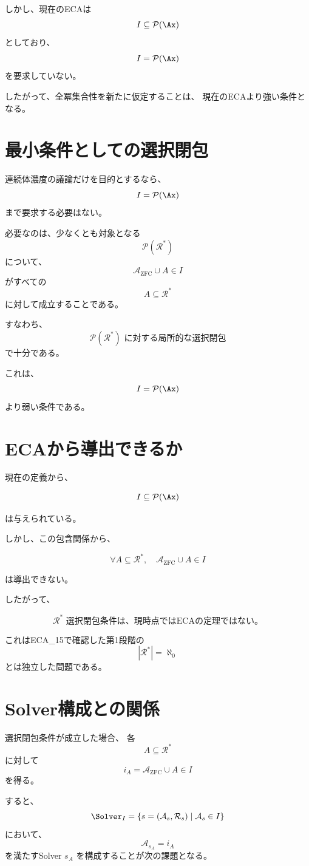 \documentclass[11pt,a4paper]{article}
\begin{document}
しかし、現在のECAは
\[
I\subseteq\mathcal P(\Ax)
\]
としており、
\[
I=\mathcal P(\Ax)
\]
を要求していない。

したがって、全冪集合性を新たに仮定することは、
現在のECAより強い条件となる。

\section{最小条件としての選択閉包}

連続体濃度の議論だけを目的とするなら、
\[
I=\mathcal P(\Ax)
\]
まで要求する必要はない。

必要なのは、少なくとも対象となる
\[
\mathcal P(\mathcal R^*)
\]
について、
\[
\mathcal A_{\mathrm{ZFC}}\cup A\in I
\]
がすべての
\[
A\subseteq\mathcal R^*
\]
に対して成立することである。

すなわち、
\[
\boxed{
\mathcal P(\mathcal R^*)
\text{ に対する局所的な選択閉包}
}
\]
で十分である。

これは、
\[
I=\mathcal P(\Ax)
\]
より弱い条件である。

\section{ECAから導出できるか}

現在の定義から、

\[
I\subseteq\mathcal P(\Ax)
\]

は与えられている。

しかし、この包含関係から、

\[
\forall A\subseteq\mathcal R^*,
\quad
\mathcal A_{\mathrm{ZFC}}\cup A\in I
\]

は導出できない。

したがって、

\[
\boxed{
\text{$\mathcal R^*$ 選択閉包条件は、現時点ではECAの定理ではない。}
}
\]

これはECA\_15で確認した第1段階の
\[
|\mathcal R^*|=\aleph_0
\]
とは独立した問題である。

\section{Solver構成との関係}

選択閉包条件が成立した場合、
各
\[
A\subseteq\mathcal R^*
\]
に対して
\[
i_A
=
\mathcal A_{\mathrm{ZFC}}\cup A
\in I
\]
を得る。

すると、
\[
\Solver_I
=
\{s=(\mathcal A_s,\mathcal R_s)\mid\mathcal A_s\in I\}
\]
において、
\[
\mathcal A_{s_A}=i_A
\]
を満たすSolver $s_A$ を構成することが次の課題となる。
\end{document}
